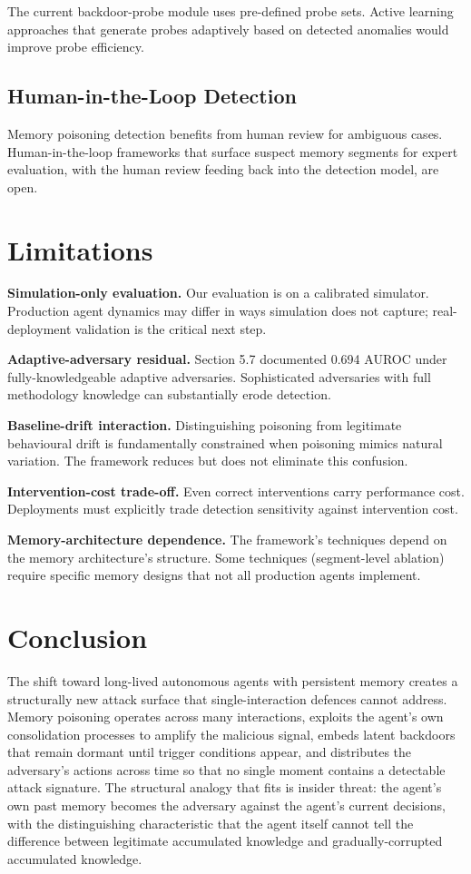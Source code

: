 \documentclass[sigconf,nonacm]{acmart}
\begin{document}
The current backdoor-probe module uses pre-defined probe sets.
Active learning approaches that generate probes adaptively based
on detected anomalies would improve probe efficiency.

\subsection{Human-in-the-Loop Detection}

Memory poisoning detection benefits from human review for
ambiguous cases. Human-in-the-loop frameworks that surface
suspect memory segments for expert evaluation, with the human
review feeding back into the detection model, are open.

\section{Limitations}

\textbf{Simulation-only evaluation.} Our evaluation is on a
calibrated simulator. Production agent dynamics may differ in
ways simulation does not capture; real-deployment validation is
the critical next step.

\textbf{Adaptive-adversary residual.} Section 5.7 documented
0.694 AUROC under fully-knowledgeable adaptive adversaries.
Sophisticated adversaries with full methodology knowledge can
substantially erode detection.

\textbf{Baseline-drift interaction.} Distinguishing poisoning
from legitimate behavioural drift is fundamentally constrained
when poisoning mimics natural variation. The framework reduces
but does not eliminate this confusion.

\textbf{Intervention-cost trade-off.} Even correct interventions
carry performance cost. Deployments must explicitly trade
detection sensitivity against intervention cost.

\textbf{Memory-architecture dependence.} The framework's
techniques depend on the memory architecture's structure. Some
techniques (segment-level ablation) require specific memory
designs that not all production agents implement.

\section{Conclusion}

The shift toward long-lived autonomous agents with persistent
memory creates a structurally new attack surface that single-interaction
defences cannot address. Memory poisoning operates across many
interactions, exploits the agent's own consolidation processes
to amplify the malicious signal, embeds latent backdoors that
remain dormant until trigger conditions appear, and distributes
the adversary's actions across time so that no single moment
contains a detectable attack signature. The structural analogy
that fits is insider threat: the agent's own past memory becomes
the adversary against the agent's current decisions, with the
distinguishing characteristic that the agent itself cannot tell
the difference between legitimate accumulated knowledge and
gradually-corrupted accumulated knowledge.
\end{document}

